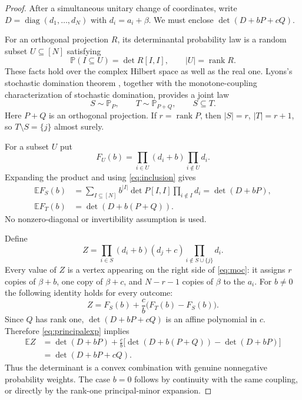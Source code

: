 \documentclass[11pt,a4paper]{article}
\theoremstyle{remark}
\begin{document}
\begin{proof}
After a simultaneous unitary change of coordinates, write
$D=\operatorname{diag}(d_1,\ldots,d_N)$ with $d_i=a_i+\beta$.
We must enclose $\det(D+bP+cQ)$.

For an orthogonal projection $R$, its determinantal probability law
is a random subset $U\subseteq[N]$ satisfying
\begin{equation}\label{eq:inclusion}
 \mathbb P(I\subseteq U)=\det R[I,I],\qquad |U|=\operatorname{rank}R.
\end{equation}
These facts hold over the complex Hilbert space as well as the real one.
Lyons's stochastic domination theorem \cite[Theorem 6.2]{lyons},
together with the monotone-coupling characterization of stochastic
domination, provides a joint law
\[
 S\sim\mathbb P_P,\qquad T\sim\mathbb P_{P+Q},\qquad S\subseteq T.
\]
Here $P+Q$ is an orthogonal projection. If $r=\operatorname{rank}P$,
then $|S|=r$, $|T|=r+1$, so $T\setminus S=\{j\}$ almost surely.

For a subset $U$ put
\[
 F_U(b)=\prod_{i\in U}(d_i+b)\prod_{i\notin U}d_i.
\]
Expanding the product and using \eqref{eq:inclusion} gives
\begin{align}
 \mathbb E F_S(b)
 &=\sum_{I\subseteq[N]} b^{|I|}\det P[I,I]\prod_{i\notin I}d_i
 =\det(D+bP),\label{eq:principalexp}\\
 \mathbb E F_T(b)&=\det(D+b(P+Q)).\nonumber
\end{align}
No nonzero-diagonal or invertibility assumption is used.

Define
\[
 Z=\prod_{i\in S}(d_i+b)(d_j+c)
       \prod_{i\notin S\cup\{j\}}d_i.
\]
Every value of $Z$ is a vertex appearing on the right side of
\eqref{eq:moc}: it assigns $r$ copies of $\beta+b$, one copy of
$\beta+c$, and $N-r-1$ copies of $\beta$ to the $a_i$.
For $b\ne0$ the following identity holds for every outcome:
\[
 Z=F_S(b)+\frac cb\bigl(F_T(b)-F_S(b)\bigr).
\]
Since $Q$ has rank one, $\det(D+bP+cQ)$ is an affine polynomial in
$c$. Therefore \eqref{eq:principalexp} implies
\begin{align*}
 \mathbb E Z
 &=\det(D+bP)+\frac cb
    \bigl[\det(D+b(P+Q))-\det(D+bP)\bigr]\\
 &=\det(D+bP+cQ).
\end{align*}
Thus the determinant is a convex combination with genuine
nonnegative probability weights. The case $b=0$ follows by
continuity with the same coupling, or directly by the rank-one
principal-minor expansion.
\end{proof}
\end{document}
